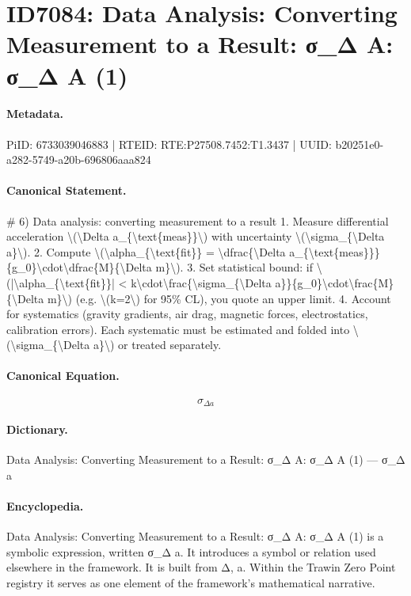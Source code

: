 \section*{ID7084: Data Analysis: Converting Measurement to a Result: σ\_Δ A: σ\_Δ A (1)}
\paragraph{Metadata.}
PiID: 6733039046883 | RTEID: RTE:P27508.7452:T1.3437 | UUID: b20251e0-a282-5749-a20b-696806aaa824

\paragraph{Canonical Statement.}
\# 6) Data analysis: converting measurement to a result 1. Measure differential acceleration \textbackslash{}(\textbackslash{}Delta a\_\{\textbackslash{}text\{meas\}\}\textbackslash{}) with uncertainty \textbackslash{}(\textbackslash{}sigma\_\{\textbackslash{}Delta a\}\textbackslash{}). 2. Compute \textbackslash{}(\textbackslash{}alpha\_\{\textbackslash{}text\{fit\}\} = \textbackslash{}dfrac\{\textbackslash{}Delta a\_\{\textbackslash{}text\{meas\}\}\}\{g\_0\}\textbackslash{}cdot\textbackslash{}dfrac\{M\}\{\textbackslash{}Delta m\}\textbackslash{}). 3. Set statistical bound: if \textbackslash{}(|\textbackslash{}alpha\_\{\textbackslash{}text\{fit\}\}| < k\textbackslash{}cdot\textbackslash{}frac\{\textbackslash{}sigma\_\{\textbackslash{}Delta a\}\}\{g\_0\}\textbackslash{}cdot\textbackslash{}frac\{M\}\{\textbackslash{}Delta m\}\textbackslash{}) (e.g. \textbackslash{}(k=2\textbackslash{}) for 95\% CL), you quote an upper limit. 4. Account for systematics (gravity gradients, air drag, magnetic forces, electrostatics, calibration errors). Each systematic must be estimated and folded into \textbackslash{}(\textbackslash{}sigma\_\{\textbackslash{}Delta a\}\textbackslash{}) or treated separately.

\paragraph{Canonical Equation.}
\[
\sigma_{\Delta a}
\]

\paragraph{Dictionary.}
Data Analysis: Converting Measurement to a Result: σ\_Δ A: σ\_Δ A (1) — σ\_Δ a

\paragraph{Encyclopedia.}
Data Analysis: Converting Measurement to a Result: σ\_Δ A: σ\_Δ A (1) is a symbolic expression, written σ\_Δ a. It introduces a symbol or relation used elsewhere in the framework. It is built from Δ, a. Within the Trawin Zero Point registry it serves as one element of the framework's mathematical narrative.
